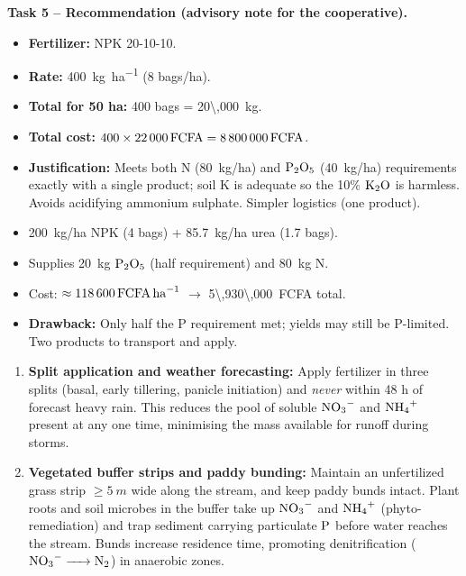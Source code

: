 \documentclass[11pt]{article}
\begin{document}
\textbf{Task 5 -- Recommendation (advisory note for the cooperative).}

\begin{aretenir}
\begin{itemize}
\item \textbf{Fertilizer:} NPK 20-10-10.
\item \textbf{Rate:} \SI{400}{kg.ha^{-1}} (8 bags/ha).
\item \textbf{Total for 50 ha:} 400 bags = \SI{20\,000}{kg}.
\item \textbf{Total cost:} $400 \times \SI{22\,000}{FCFA} = \SI{8\,800\,000}{FCFA}$.
\item \textbf{Justification:} Meets both N (\SI{80}{kg/ha}) and $\ce{P2O5}$ (\SI{40}{kg/ha}) requirements exactly with a single product; soil K is adequate so the 10\% $\ce{K2O}$ is harmless. Avoids acidifying ammonium sulphate. Simpler logistics (one product).
\end{itemize}
\end{aretenir}

\begin{aretenir}
\begin{itemize}
\item \SI{200}{kg/ha} NPK (4 bags) + \SI{85.7}{kg/ha} urea (1.7 bags).
\item Supplies \SI{20}{kg} $\ce{P2O5}$ (half requirement) and \SI{80}{kg} N.
\item Cost: $\approx \SI{118\,600}{FCFA.ha^{-1}}$ $\to$ \SI{5\,930\,000}{FCFA} total.
\item \textbf{Drawback:} Only half the P requirement met; yields may still be P-limited. Two products to transport and apply.
\end{itemize}
\end{aretenir}

\begin{propriete}
\begin{enumerate}
\item \textbf{Split application and weather forecasting:} Apply fertilizer in three splits (basal, early tillering, panicle initiation) and \emph{never} within 48 h of forecast heavy rain. This reduces the pool of soluble $\ce{NO3-}$ and $\ce{NH4+}$ present at any one time, minimising the mass available for runoff during storms.
\item \textbf{Vegetated buffer strips and paddy bunding:} Maintain an unfertilized grass strip $\ge \SI{5}{m}$ wide along the stream, and keep paddy bunds intact. Plant roots and soil microbes in the buffer take up $\ce{NO3-}$ and $\ce{NH4+}$ (phyto-remediation) and trap sediment carrying particulate $\ce{P}$ before water reaches the stream. Bunds increase residence time, promoting denitrification ($\ce{NO3- -> N2}$) in anaerobic zones.
\end{enumerate}
\end{propriete}
\end{document}
